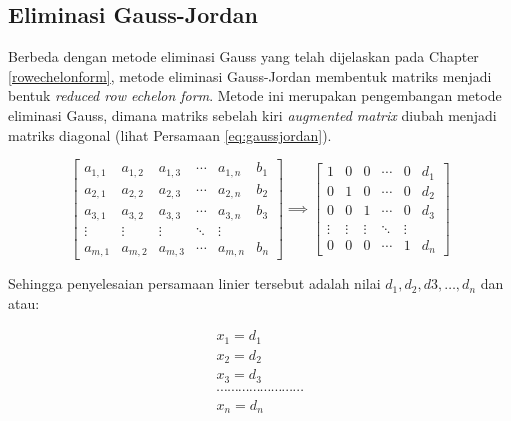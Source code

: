 \documentclass[
]{book}
\theoremstyle{definition}
\theoremstyle{definition}
\theoremstyle{definition}
\theoremstyle{definition}
\theoremstyle{remark}
\begin{document}
\hypertarget{redrowechelonform}{%
\subsection{Eliminasi Gauss-Jordan}\label{redrowechelonform}}

Berbeda dengan metode eliminasi Gauss yang telah dijelaskan pada Chapter \ref{rowechelonform}, metode eliminasi Gauss-Jordan membentuk matriks menjadi bentuk \emph{reduced row echelon form}. Metode ini merupakan pengembangan metode eliminasi Gauss, dimana matriks sebelah kiri \emph{augmented matrix} diubah menjadi matriks diagonal (lihat Persamaan \eqref{eq:gaussjordan}).

\begin{equation}
\begin{bmatrix}
     a_{1,1} & a_{1,2} & a_{1,3} &\cdots& a_{1,n} & b_1     \\[0.3em]
     a_{2,1} & a_{2,2} & a_{2,3} &\cdots& a_{2,n} & b_2     \\[0.3em]
     a_{3,1} & a_{3,2} & a_{3,3} &\cdots& a_{3,n} & b_3     \\[0.3em]
     \vdots  & \vdots  & \vdots &\ddots& \vdots             \\[0.3em]
     a_{m,1} & a_{m,2} & a_{m,3} &\cdots& a_{m,n} & b_n
     \end{bmatrix}
\implies
\begin{bmatrix}
     1       & 0       & 0       &\cdots& 0       & d_1     \\[0.3em]
     0       & 1       & 0       &\cdots& 0       & d_2     \\[0.3em]
     0       & 0       & 1       &\cdots& 0       & d_3     \\[0.3em]
     \vdots  & \vdots  & \vdots &\ddots& \vdots             \\[0.3em]
     0       & 0       & 0      &\cdots& 1        & d_n
     \end{bmatrix}
  \label{eq:gaussjordan}
\end{equation}

Sehingga penyelesaian persamaan linier tersebut adalah nilai \(d_1,d_2,d3,\dots,d_n\) dan atau:

\begin{equation}
\begin{matrix}
  x_1=d_1 \\
  x_2=d_2 \\
  x_3=d_3 \\
  \cdots\cdots\cdots\cdots\cdots\cdots\cdots\cdots       \\
  x_n=d_n
   \end{matrix}
  \label{eq:gaussjordansolution}
\end{equation}
\end{document}
